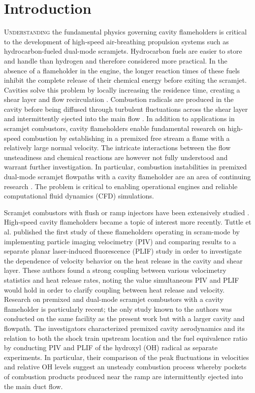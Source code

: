 \section*{Introduction}
\lettrine{U}{nderstanding} the fundamental physics governing cavity flameholders is critical to the development of high-speed air-breathing propulsion systems such as hydrocarbon-fueled dual-mode scramjets. Hydrocarbon fuels are easier to store and handle than hydrogen and therefore considered more practical. In the absence of a flameholder in the engine, the longer reaction times of these fuels inhibit the complete release of their chemical energy before exiting the scramjet. Cavities solve this problem by locally increasing the residence time, creating a shear layer and flow recirculation \citep{Ben-YakarHanson2001}. Combustion radicals are produced in the cavity before being diffused through turbulent fluctuations across the shear layer and intermittently ejected into the main flow \citep{Kirik2017}. In addition to applications in scramjet combustors, cavity flameholders enable fundamental research on high-speed combustion by establishing in a premixed free stream a flame with a relatively large normal velocity. The intricate interactions between the flow unsteadiness and chemical reactions are however not fully understood and warrant further investigation. In particular, combustion instabilities in premixed dual-mode scramjet flowpaths with a cavity flameholder are an area of continuing research \citep{WangWangSun2014}. The problem is critical to enabling operational engines and reliable computational fluid dynamics (CFD) simulations.
 
Scramjet combustors with flush or ramp injectors have been extensively studied \citep{RockwellGoyneRiceEtAl2014, LaurenceLieberSchrammEtAl2015, LePichonLaverdant2016, FangHong2018}. High-speed cavity flameholders became a topic of interest more recently. Tuttle et al.
\cite{TuttleCarterHsu2014} published the first study of these flameholders operating in scram-mode by implementing particle imaging velocimetry (PIV) and comparing results to a separate planar laser-induced fluorescence (PLIF) study in order to investigate the dependence of velocity behavior on the heat release in the cavity and shear layer. These authors found a strong coupling between various velocimetry statistics and heat release rates, noting the value simultaneous PIV and PLIF would hold in order to clarify coupling between heat release and velocity.
Research on premixed and dual-mode scramjet combustors with a cavity flameholder is particularly recent; the only study known to the authors \cite{KirikGoyneMcDanielEtAl2017} was conducted on the same facility as the present work but with a larger cavity and flowpath. The investigators characterized premixed cavity aerodynamics and its relation to both the shock train upstream location and the fuel equivalence ratio by conducting PIV and PLIF of the hydroxyl (OH) radical as separate experiments. In particular, their comparison of the peak fluctuations in velocities and relative OH levels suggest an unsteady combustion process whereby pockets of combustion products produced near the ramp are intermittently ejected into the main duct flow.


